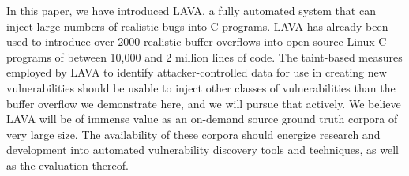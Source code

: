 In this paper, we have introduced LAVA, a fully automated system that can inject large numbers of realistic bugs into C programs.
LAVA has already been used to introduce over 2000 realistic buffer overflows into open-source Linux C programs of between 10,000 and 2 million lines of code.  
The taint-based measures employed by LAVA to identify attacker-controlled data for use in creating new vulnerabilities should be usable to inject other classes of vulnerabilities than the buffer overflow we demonstrate here, and we will pursue that actively.  
We believe LAVA will be of immense value as an on-demand source ground truth corpora of very large size.
The availability of these corpora should energize research and development into automated vulnerability discovery tools and techniques, as well as the evaluation thereof.



